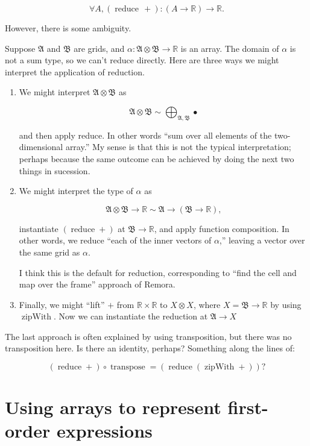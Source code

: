 \documentclass[11pt]{article}
\newcommand{\gr}[1]{\mathfrak{#1}}
\newcommand{\R}{\mathbb{R}}
\newcommand{\unit}{\bullet}
\DeclareMathOperator{\reduce}{reduce}
\DeclareMathOperator{\zipWith}{zipWith}
\begin{document}
$$
\forall A, (\operatorname{reduce}\, +) : (A \to \R)\to \R.
$$

However, there is some ambiguity. 

Suppose \(\gr{A}\) and \(\gr{B}\) are grids, and \(\alpha : \gr{A}\otimes\gr{B}\to\R\)
is an array. The domain of \(\alpha\) is not a sum type, so we can't reduce
directly. Here are three ways we might interpret the application of reduction. 

\begin{enumerate}
\item We might interpret \(\gr{A}\otimes\gr{B}\) as 

$$
   \gr{A}\otimes\gr{B} \sim \bigoplus_{\gr{A}, \gr{B}} \unit  
   $$

and then apply reduce. In other words “sum over all elements of the
two-dimensional array.” My sense is that this is not the typical
interpretation; perhaps because the same outcome can be achieved by doing the
next two things in sucession.

\item We might interpret the type of \(\alpha\) as

$$
   \gr{A}\otimes\gr{B}\to\R \sim \gr{A} \to (\gr{B}\to \R),
   $$

instantiate \((\reduce +)\) at \(\gr{B}\to\R\), and apply function
composition. In other words, we reduce “each of the inner vectors of
\(\alpha\),” leaving a vector over the same grid as \(\alpha\).

I think this is the default for reduction, corresponding to “find the cell
and map over the frame” approach of Remora.

\item Finally, we might “lift” \(+\) from \(\R\times \R\) to \(X\otimes X\), where \(X =
   \gr{B}\to\R\) by using \(\zipWith\). Now we can instantiate the reduction at
\(\gr{A}\to X\)
\end{enumerate}

The last approach is often explained by using transposition, but there was no
transposition here. Is there an identity, perhaps? Something along the lines of:

$$
(\reduce +) \circ \operatorname{transpose} = (\reduce (\zipWith +)) ? 
$$

\section{Using arrays to represent first-order expressions}
\label{sec:orgac340af}
\end{document}
